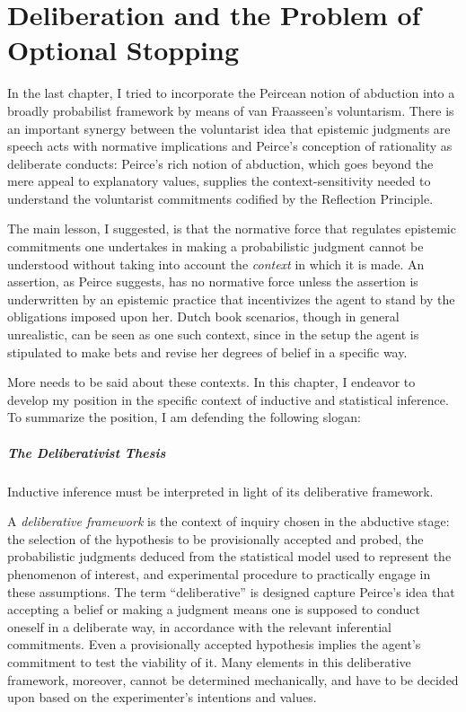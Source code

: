 
\hypertarget{deliberation-and-the-problem-of-optional-stopping}{%
\chapter{Deliberation and the Problem of Optional
Stopping}\label{ch:stopping}}

In the last chapter, I tried to incorporate the Peircean notion of
abduction into a broadly probabilist framework by means of van
Fraasseen's voluntarism. There is an important synergy between the
voluntarist idea that epistemic judgments are speech acts with normative
implications and Peirce's conception of rationality as deliberate
conducts: Peirce's rich notion of abduction, which
goes beyond the mere appeal to explanatory values, supplies the context-sensitivity needed to understand the voluntarist commitments codified by the Reflection Principle.

The main lesson, I suggested, is that the normative force that regulates
epistemic commitments one undertakes in making a probabilistic judgment cannot
be understood without taking into account the \emph{context} in which it is made. An
assertion, as Peirce suggests, has no normative force unless the
assertion is underwritten by an epistemic practice that incentivizes the
agent to stand by the obligations imposed upon her. Dutch book
scenarios, though in general unrealistic, can be seen as one such
context, since in the setup the agent is stipulated to make bets and
revise her degrees of belief in a specific way.

More needs to be said about these contexts. In this chapter, I endeavor to develop my position in the specific
context of inductive and statistical inference. To summarize the position, I am
defending the following slogan:


\paragraph{The Deliberativist Thesis} Inductive inference must be interpreted in
light of its deliberative framework.


A \emph{deliberative framework} is the context of inquiry chosen in the
abductive stage: the selection of the hypothesis to be provisionally
accepted and probed, the probabilistic judgments deduced from the
statistical model used to represent the phenomenon of interest, and
experimental procedure to practically engage in these assumptions. The
term ``deliberative'' is designed capture Peirce's idea that accepting a
belief or making a judgment means one is supposed to conduct oneself in
a deliberate way, in accordance with the relevant inferential commitments. Even a provisionally accepted hypothesis implies the agent's commitment to test the viability of it. Many elements in this deliberative framework, moreover, cannot be determined mechanically, and have to be decided upon based on the experimenter's intentions and values.

